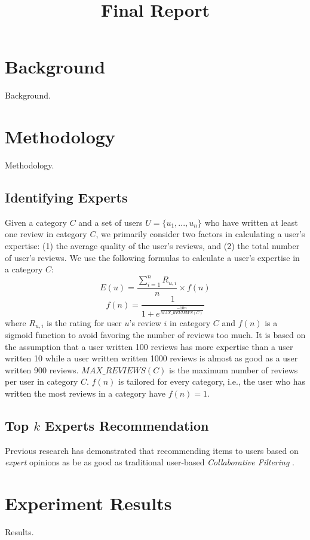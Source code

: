 \documentclass[12pt]{article}
\title{Final Report}
\author{}
\begin{document}
\maketitle


\section{Background}
Background.
\section{Methodology}
Methodology.

\subsection{Identifying Experts} %
\label{sub:identifying_experts}

Given a category $C$ and a set of users $U = \{{u_{1}, ..., u_{n}}\}$ who have written at least one review in category $C$, we primarily consider two factors in calculating a user's expertise: (1) the average quality of the user's reviews, and (2) the total number of user's reviews. We use the following formulas to calculate a user's expertise in a category $C$:
\begin{equation}
E(u) = \frac{\sum_{i=1}^n R_{u, i}} {n} \times f(n)
\end{equation}
\begin{equation}
f(n) = \frac{1}{1 + e^{\frac{-10n} {MAX\_REVIEWS(C)}}}
\end{equation}
where $R_{u, i}$ is the rating for user $u$'s review $i$ in category $C$ and $f(n)$ is a sigmoid function to avoid favoring the number of reviews too much. It is based on the assumption that a user written 100 reviews has more expertise than a user written 10 while a user written written 1000 reviews is almost as good as a user written 900 reviews. $MAX\_REVIEWS(C)$ is the maximum number of reviews per user in category $C$. $f(n)$ is tailored for every category, i.e., the user who has written the most reviews in a category have $f(n)=1$.


\subsection{Top $k$ Experts Recommendation} %
\label{sub:expert_recommendation}

Previous research has demonstrated that recommending items to users based on \emph{expert} opinions as be as good as traditional user-based \emph{Collaborative Filtering} \cite{Amatriain:2009p101}.


\section{Experiment Results}
Results.




\end{document}

